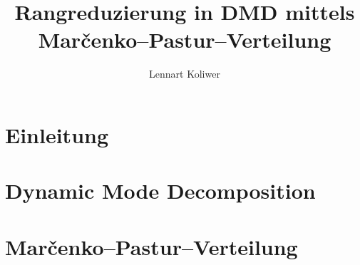 \documentclass{thesis}
\begin{document}
\author{Lennart Koliwer}
\title{Rangreduzierung in DMD mittels Mar\v{c}enko--Pastur--Verteilung}

\frontmatter

\thispagestyle{empty}
\tableofcontents

\mainmatter
%



\chapter{Einleitung}

\chapter{Dynamic Mode Decomposition}

\chapter{Mar\v{c}enko--Pastur--Verteilung}

%
%
%

\appendix
% 


\backmatter

\cleardoubleevenpage
\printbibliography
\cleardoubleevenpage
\declarationofauthorship
\end{document}
